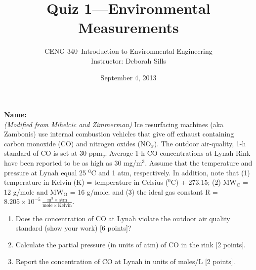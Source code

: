 \documentclass[12pt,letterpaper]{article}
\begin{document}
\setlength{\parindent}{0cm} 


\frenchspacing


\title {\Large Quiz 1---Environmental Measurements} 
\author {CENG 340--Introduction to Environmental Engineering\\
Instructor: Deborah Sills}
\date {September 4, 2013}
\maketitle


\vspace{-0.2 in}
\textbf{Name:}\\

\emph{(Modified from Mihelcic and Zimmerman)} Ice resurfacing machines (aka Zambonis) use internal combustion vehicles that give off exhaust containing carbon monoxide (CO) and nitrogen oxides (NO$_x$).  The outdoor air-quality, 1-h standard of CO is set at 30 ppm$_v$. Average 1-h CO concentrations at Lynah Rink have been reported to be as high as 30 mg/m$^3$. Assume that the temperature and pressure at Lynah equal 25 $^0$C and 1 atm, respectively.  In addition, note that (1) temperature in Kelvin (K) = temperature in Celsius ($^0$C) + 273.15; (2) MW$\mathrm{_C}$ = 12 g/mole and MW$\mathrm{_O}$ = 16 g/mole; and (3) the ideal gas constant R = $8.205\times 10^{-5}\, \mathrm{\frac{m^3 \times atm}{mole \times Kelvin}}$. 


\begin{enumerate}

\item Does the concentration of CO at Lynah violate the outdoor air quality standard (show your work) [6 points]?
\vspace{2.6 in}

\item Calculate the partial pressure (in units of atm) of CO in the rink [2 points]. 

\vspace{1.0 in}

\item Report the concentration of CO at Lynah in units of moles/L [2 points].

\end{enumerate}
\end{document}

